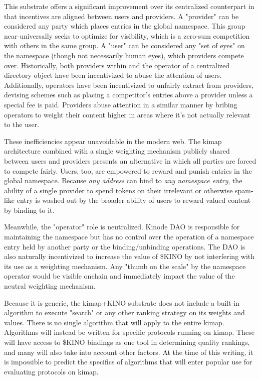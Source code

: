 \documentclass[runningheads]{llncs}
\begin{document}
This substrate offers a significant improvement over its centralized counterpart in that incentives are aligned between users and providers.
A "provider" can be considered any party which places entries in the global namespace.
This group near-universally seeks to optimize for visibility, which is a zero-sum competition with others in the same group.
A "user" can be considered any "set of eyes" on the namespace (though not necessarily human eyes), which providers compete over.
Historically, both providers within and the operator of a centralized directory object have been incentivized to abuse the attention of users.
Additionally, operators have been incentivized to unfairly extract from providers, devising schemes such as placing a competitor's entries above a provider unless a special fee is paid.
Providers abuse attention in a similar manner by bribing operators to weight their content higher in areas where it's not actually relevant to the user.

These inefficiencies appear unavoidable in the modern web.
The kimap architecture combined with a single weighting mechanism publicly shared between users and providers presents an alternative in which all parties are forced to compete fairly.
Users, too, are empowered to reward and punish entries in the global namespace.
Because \textit{any address} can bind to \textit{any namespace entry}, the ability of a single provider to spend tokens on their irrelevant or otherwise spam-like entry is washed out by the broader ability of users to reward valued content by binding to it.

Meanwhile, the "operator" role is neutralized.
Kinode DAO is responsible for maintaining the namespace but has no control over the operation of a namespace entry held by another party or the binding/unbinding operations.
The DAO is also naturally incentivized to increase the value of \$KINO by not interfering with its use as a weighting mechanism.
Any "thumb on the scale" by the namespace operator would be visible onchain and immediately impact the value of the neutral weighting mechanism.

Because it is generic, the kimap+KINO substrate does not include a built-in algorithm to execute "search" or any other ranking strategy on its weights and values.
There is no single algorithm that will apply to the entire kimap.
Algorithms will instead be written for specific protocols running on kimap.
These will have access to \$KINO bindings as one tool in determining quality rankings, and many will also take into account other factors.
At the time of this writing, it is impossible to predict the specifics of algorithms that will enter popular use for evaluating protocols on kimap.
\end{document}
